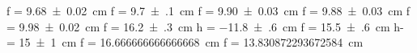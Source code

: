 f = \SI{+9.68(2)}{\centi\meter}
f = \SI{+9.7(1)}{\centi\meter}
f = \SI{+9.90(3)}{\centi\meter}
f = \SI{+9.88(3)}{\centi\meter}
f = \SI{+9.98(2)}{\centi\meter}
f = \SI{+16.2(3)}{\centi\meter}
h = \SI{-11.8(6)}{\centi\meter}
f = \SI{+15.5(6)}{\centi\meter}
h- = \SI{+15(1)}{\centi\meter}
f = \SI[]{16.666666666666668}{\centi\meter}
f = \SI[]{13.830872293672584}{\centi\meter}
